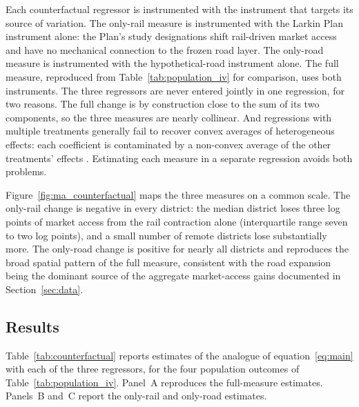 Each counterfactual regressor is instrumented with the instrument that
targets its source of variation. The only-rail measure is instrumented
with the Larkin Plan instrument alone: the Plan's study designations
shift rail-driven market access and have no mechanical connection to
the frozen road layer. The only-road measure is instrumented with the
hypothetical-road instrument alone. The full measure, reproduced from
Table~\ref{tab:population_iv} for comparison, uses both instruments.
The three regressors are never entered jointly in one regression, for
two reasons. The full change is by construction close to the sum of
its two components, so the three measures are nearly collinear. And
regressions with multiple treatments generally fail to recover convex
averages of heterogeneous effects: each coefficient is contaminated
by a non-convex average of the other treatments' effects
\citep{goldsmithpinkhamhullkolesar2024}. Estimating each measure in a
separate regression avoids both problems.

Figure~\ref{fig:ma_counterfactual} maps the three measures on a common
scale. The only-rail change is negative in every district: the median
district loses three log points of market access from the rail
contraction alone (interquartile range seven to two log points), and a
small number of remote districts lose substantially more. The only-road change is
positive for nearly all districts and reproduces the broad spatial
pattern of the full measure, consistent with the road expansion being
the dominant source of the aggregate market-access gains documented in
Section~\ref{sec:data}.

\subsection{Results}
\label{sec:cf_results}

Table~\ref{tab:counterfactual} reports estimates of the analogue of
equation~\eqref{eq:main} with each of the three regressors, for the
four population outcomes of Table~\ref{tab:population_iv}. Panel~A
reproduces the full-measure estimates. Panels~B and~C report the
only-rail and only-road estimates.

